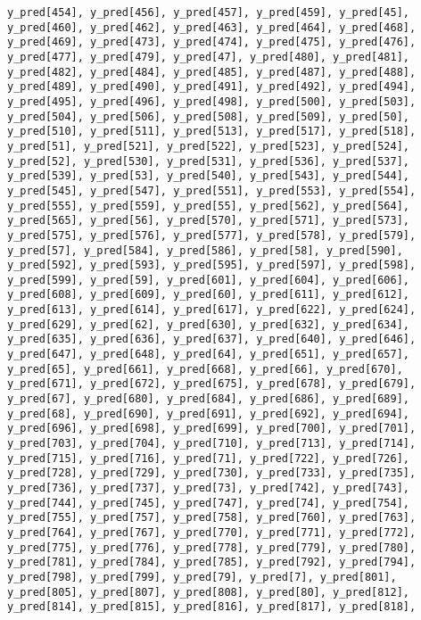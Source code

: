 \documentclass[
  letterpaper,
  DIV=11,
  numbers=noendperiod]{scrartcl}
\begin{document}
\begin{verbatim}
y_pred[454], y_pred[456], y_pred[457], y_pred[459], y_pred[45],
y_pred[460], y_pred[462], y_pred[463], y_pred[464], y_pred[468],
y_pred[469], y_pred[473], y_pred[474], y_pred[475], y_pred[476],
y_pred[477], y_pred[479], y_pred[47], y_pred[480], y_pred[481],
y_pred[482], y_pred[484], y_pred[485], y_pred[487], y_pred[488],
y_pred[489], y_pred[490], y_pred[491], y_pred[492], y_pred[494],
y_pred[495], y_pred[496], y_pred[498], y_pred[500], y_pred[503],
y_pred[504], y_pred[506], y_pred[508], y_pred[509], y_pred[50],
y_pred[510], y_pred[511], y_pred[513], y_pred[517], y_pred[518],
y_pred[51], y_pred[521], y_pred[522], y_pred[523], y_pred[524],
y_pred[52], y_pred[530], y_pred[531], y_pred[536], y_pred[537],
y_pred[539], y_pred[53], y_pred[540], y_pred[543], y_pred[544],
y_pred[545], y_pred[547], y_pred[551], y_pred[553], y_pred[554],
y_pred[555], y_pred[559], y_pred[55], y_pred[562], y_pred[564],
y_pred[565], y_pred[56], y_pred[570], y_pred[571], y_pred[573],
y_pred[575], y_pred[576], y_pred[577], y_pred[578], y_pred[579],
y_pred[57], y_pred[584], y_pred[586], y_pred[58], y_pred[590],
y_pred[592], y_pred[593], y_pred[595], y_pred[597], y_pred[598],
y_pred[599], y_pred[59], y_pred[601], y_pred[604], y_pred[606],
y_pred[608], y_pred[609], y_pred[60], y_pred[611], y_pred[612],
y_pred[613], y_pred[614], y_pred[617], y_pred[622], y_pred[624],
y_pred[629], y_pred[62], y_pred[630], y_pred[632], y_pred[634],
y_pred[635], y_pred[636], y_pred[637], y_pred[640], y_pred[646],
y_pred[647], y_pred[648], y_pred[64], y_pred[651], y_pred[657],
y_pred[65], y_pred[661], y_pred[668], y_pred[66], y_pred[670],
y_pred[671], y_pred[672], y_pred[675], y_pred[678], y_pred[679],
y_pred[67], y_pred[680], y_pred[684], y_pred[686], y_pred[689],
y_pred[68], y_pred[690], y_pred[691], y_pred[692], y_pred[694],
y_pred[696], y_pred[698], y_pred[699], y_pred[700], y_pred[701],
y_pred[703], y_pred[704], y_pred[710], y_pred[713], y_pred[714],
y_pred[715], y_pred[716], y_pred[71], y_pred[722], y_pred[726],
y_pred[728], y_pred[729], y_pred[730], y_pred[733], y_pred[735],
y_pred[736], y_pred[737], y_pred[73], y_pred[742], y_pred[743],
y_pred[744], y_pred[745], y_pred[747], y_pred[74], y_pred[754],
y_pred[755], y_pred[757], y_pred[758], y_pred[760], y_pred[763],
y_pred[764], y_pred[767], y_pred[770], y_pred[771], y_pred[772],
y_pred[775], y_pred[776], y_pred[778], y_pred[779], y_pred[780],
y_pred[781], y_pred[784], y_pred[785], y_pred[792], y_pred[794],
y_pred[798], y_pred[799], y_pred[79], y_pred[7], y_pred[801],
y_pred[805], y_pred[807], y_pred[808], y_pred[80], y_pred[812],
y_pred[814], y_pred[815], y_pred[816], y_pred[817], y_pred[818],

\end{verbatim}
\end{document}
